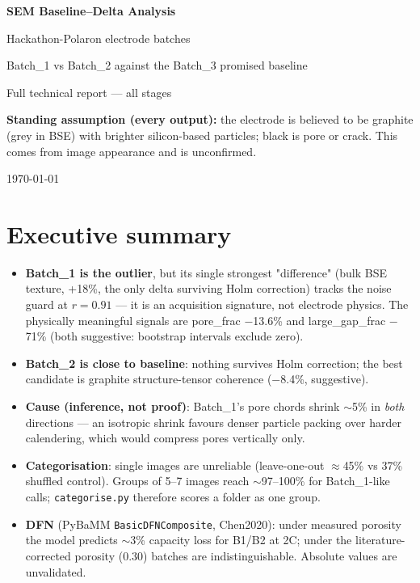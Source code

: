 \documentclass[11pt,a4paper]{article}
\begin{document}
\begin{titlepage}
\centering
\vspace*{3cm}
{\LARGE\bfseries SEM Baseline--Delta Analysis\par}
\vspace{0.6cm}
{\Large Hackathon-Polaron electrode batches\par}
\vspace{1.2cm}
{\large Batch\_1 vs Batch\_2 against the Batch\_3 promised baseline\par}
\vspace{0.8cm}
{\large Full technical report --- all stages\par}
\vspace{2cm}
\begin{minipage}{0.85\textwidth}\small
\textbf{Standing assumption (every output):} the electrode is believed to be graphite (grey in BSE) with brighter silicon-based particles; black is pore or crack. This comes from image appearance and is unconfirmed.
\end{minipage}
\vfill
{\large \today\par}
\end{titlepage}
\tableofcontents
\newpage


\section{Executive summary}
\begin{itemize}
\item \textbf{Batch\_1 is the outlier}, but its single strongest "difference"
(bulk BSE texture, +18\%, the only delta surviving Holm correction) tracks the
noise guard at $r{=}0.91$ --- it is an acquisition signature, not electrode
physics. The physically meaningful signals are pore\_frac $-$13.6\% and
large\_gap\_frac $-$71\% (both suggestive: bootstrap intervals exclude zero).
\item \textbf{Batch\_2 is close to baseline}: nothing survives Holm
correction; the best candidate is graphite structure-tensor coherence
($-$8.4\%, suggestive).
\item \textbf{Cause (inference, not proof)}: Batch\_1's pore chords shrink
$\sim$5\% in \emph{both} directions --- an isotropic shrink favours denser
particle packing over harder calendering, which would compress pores
vertically only.
\item \textbf{Categorisation}: single images are unreliable (leave-one-out
$\approx$45\% vs 37\% shuffled control). Groups of 5--7 images reach
$\sim$97--100\% for Batch\_1-like calls; \texttt{categorise.py} therefore
scores a folder as one group.
\item \textbf{DFN} (PyBaMM \texttt{BasicDFNComposite}, Chen2020): under
measured porosity the model predicts $\sim$3\% capacity loss for B1/B2 at 2C;
under the literature-corrected porosity (0.30) batches are indistinguishable.
Absolute values are unvalidated.
\end{itemize}
\end{document}
